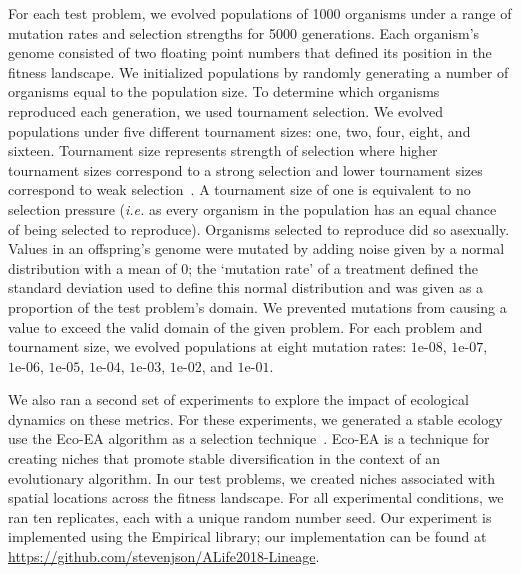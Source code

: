 \documentclass[letterpaper]{article}
\begin{document}
For each test problem, we evolved populations of 1000 organisms under a range of mutation rates and selection strengths for 5000 generations. Each organism's genome consisted of two floating point numbers that defined its position in the fitness landscape. 
We initialized populations by randomly generating a number of organisms equal to the population size. 
To determine which organisms reproduced each generation, we used tournament selection. We evolved populations under five different tournament sizes: one, two, four, eight, and sixteen.  Tournament size represents strength of selection where higher tournament sizes correspond to a strong selection and lower tournament sizes correspond to weak selection~\citep{blickle1995mathematical}.
A tournament size of one is equivalent to no selection pressure (\textit{i.e.} as every organism in the population has an equal chance of being selected to reproduce). Organisms selected to reproduce did so asexually. Values in an offspring's genome were mutated by adding noise given by a normal distribution with a mean of 0; the `mutation rate' of a treatment defined the standard deviation used to define this normal distribution and was given as a proportion of the test problem's domain. 
We prevented mutations from causing a value to exceed the valid domain of the given problem. 
For each problem and tournament size, we evolved populations at eight mutation rates: $1\text{e-}08$, $1\text{e-}07$, $1\text{e-}06$, $1\text{e-}05$, $1\text{e-}04$, $1\text{e-}03$, $1\text{e-}02$, and $1\text{e-}01$. 

We also ran a second set of experiments to explore the impact of ecological dynamics on these metrics. For these experiments, we generated a stable ecology use the Eco-EA algorithm as a selection technique~\citep{goings_ecology-based_2012}. Eco-EA is %
a technique for creating niches that promote stable diversification in the context of an evolutionary algorithm. In %
our test problems, we created niches associated with spatial locations across the fitness landscape. 
For all experimental conditions, we ran ten replicates, each with a unique random number seed. 
Our experiment is implemented using the Empirical library; our implementation can be found at \url{https://github.com/stevenjson/ALife2018-Lineage}. %
\end{document}
